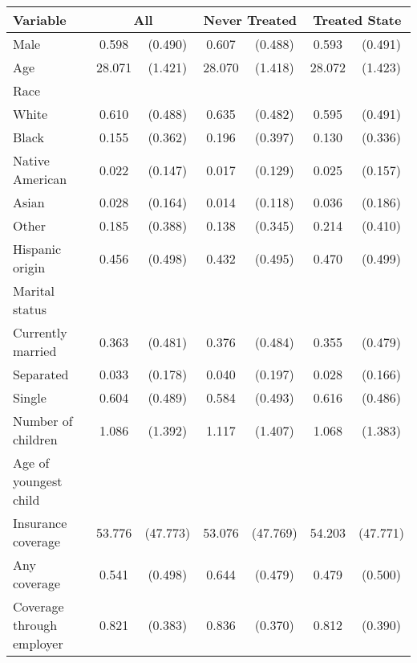 \begin{tabular}{lcccccc}
\toprule
\toprule
 Variable & \multicolumn{2}{c}{All} & \multicolumn{2}{c}{Never Treated} & \multicolumn{2}{c}{Treated State} \\
\midrule 
 Male  & 0.598 & (0.490)  & 0.607 & (0.488)  & 0.593 & (0.491)  \\
 Age  & 28.071 & (1.421)  & 28.070 & (1.418)  & 28.072 & (1.423)  \\
 Race  & & &  \\
 \hspace{0.3cm}  White  & 0.610 & (0.488)  & 0.635 & (0.482)  & 0.595 & (0.491)  \\
 \hspace{0.3cm}  Black  & 0.155 & (0.362)  & 0.196 & (0.397)  & 0.130 & (0.336)  \\
 \hspace{0.3cm}  Native American  & 0.022 & (0.147)  & 0.017 & (0.129)  & 0.025 & (0.157)  \\
 \hspace{0.3cm}  Asian  & 0.028 & (0.164)  & 0.014 & (0.118)  & 0.036 & (0.186)  \\
 \hspace{0.3cm}  Other  & 0.185 & (0.388)  & 0.138 & (0.345)  & 0.214 & (0.410)  \\
 Hispanic origin  & 0.456 & (0.498)  & 0.432 & (0.495)  & 0.470 & (0.499)  \\
 Marital status  & & &  \\
 \hspace{0.3cm} Currently married  & 0.363 & (0.481)  & 0.376 & (0.484)  & 0.355 & (0.479)  \\
 \hspace{0.3cm} Separated  & 0.033 & (0.178)  & 0.040 & (0.197)  & 0.028 & (0.166)  \\
 \hspace{0.3cm} Single  & 0.604 & (0.489)  & 0.584 & (0.493)  & 0.616 & (0.486)  \\
 Number of children  & 1.086 & (1.392)  & 1.117 & (1.407)  & 1.068 & (1.383)  \\
 Age of youngest child  & & &  \\
 Insurance coverage  & 53.776 & (47.773)  & 53.076 & (47.769)  & 54.203 & (47.771)  \\
 \hspace{0.3cm}  Any coverage  & 0.541 & (0.498)  & 0.644 & (0.479)  & 0.479 & (0.500)  \\
 \hspace{0.3cm}  Coverage through employer  & 0.821 & (0.383)  & 0.836 & (0.370)  & 0.812 & (0.390)  \\

\end{tabular}
